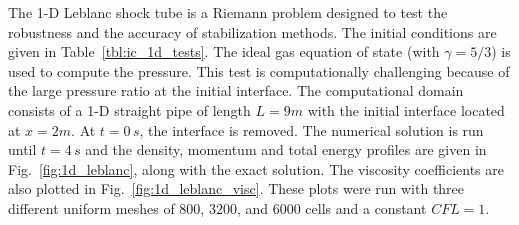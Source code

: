 \documentclass[preprint,10pt]{elsarticle}
\newcommand{\fig}[1]{Fig.~\ref{#1}}                      %
\newcommand{\tbl}[1]{Table~\ref{#1}}                     %
\begin{document}
The 1-D Leblanc shock tube is a Riemann problem designed to test the robustness and the accuracy of stabilization methods. 
The initial conditions are given in \tbl{tbl:ic_1d_tests}. The ideal gas equation of state (with $\gamma=5/3$) is used to 
compute the pressure.
This test is computationally challenging because of the large pressure ratio at the initial interface.
The computational domain consists of a 1-D straight pipe of length $L=9m$ with the initial interface located at $x=2m$. 
At $t=0\,s$, the interface is removed. The numerical solution is run until $t=4\,s$ and the density, momentum and 
total energy profiles are given in \fig{fig:1d_leblanc}, along with the exact solution. The viscosity coefficients 
are also plotted in \fig{fig:1d_leblanc_visc}. These plots were run with three different uniform meshes of $800$, 
$3200$, and $6000$ cells and a constant $CFL = 1$.
\end{document}

